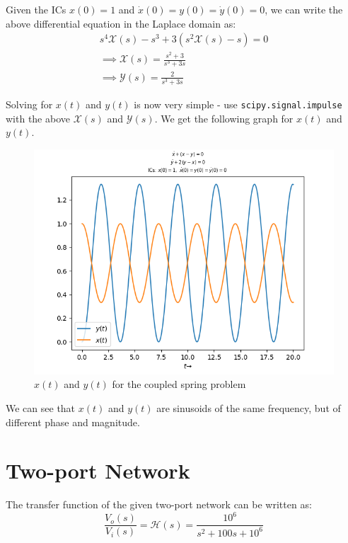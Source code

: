 \documentclass[11pt, a4paper, twoside]{article}
\begin{document}
    Given the ICs $x(0)=1$ and $\dot{x}(0)=y(0)=\dot{y}(0)=0$, we can write the above differential equation in the Laplace domain as:
    \begin{gather*}
        s^4\mathcal{X}(s)-s^3 + 3(s^2\mathcal{X}(s)-s)=0\\
        \implies \mathcal{X}(s) = \frac{s^2+3}{s^3+3s}\\
        \implies \mathcal{Y}(s) = \frac{2}{s^3+3s}
    \end{gather*}
    
    Solving for $x(t)$ and $y(t)$ is now very simple - use \texttt{scipy.signal.impulse} with the above $\mathcal{X}(s)$ and $\mathcal{Y}(s)$. We get the following graph for $x(t)$ and $y(t)$.
    \begin{figure}[H]
        \centering
        \includegraphics[scale=0.7]{Fig 4.png}
        \caption{$x(t)$ and $y(t)$ for the coupled spring problem}
        \label{fig:Fig4}
    \end{figure}
    
    We can see that $x(t)$ and $y(t)$ are sinusoids of the same frequency, but of different phase and magnitude.
\section{Two-port Network}
    The transfer function of the given two-port network can be written as:
    \begin{equation*}
        \frac{V_o(s)}{V_i(s)} = \mathcal{H}(s) = \frac{10^6}{s^2+100s+10^6}
    \end{equation*}
    
\end{document}
